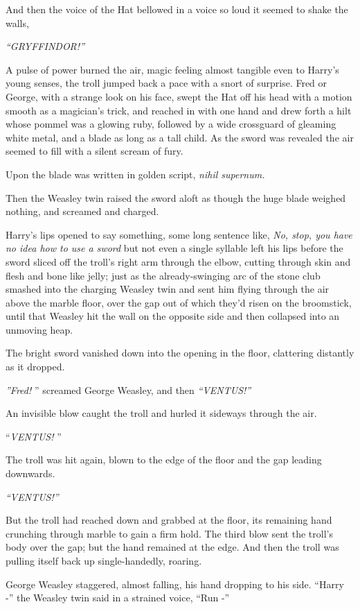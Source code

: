 And then the voice of the Hat bellowed in a voice so loud it seemed to
shake the walls,

\emph{``GRYFFINDOR!''}

A pulse of power burned the air, magic feeling almost tangible even to
Harry's young senses, the troll jumped back a pace with a snort of
surprise. Fred or George, with a strange look on his face, swept the Hat
off his head with a motion smooth as a magician's trick, and reached in
with one hand and drew forth a hilt whose pommel was a glowing ruby,
followed by a wide crossguard of gleaming white metal, and a blade as
long as a tall child. As the sword was revealed the air seemed to fill
with a silent scream of fury.

Upon the blade was written in golden script, \emph{nihil supernum.}

Then the Weasley twin raised the sword aloft as though the huge blade
weighed nothing, and screamed and charged.

Harry's lips opened to say something, some long sentence like, \emph{No,
stop, you have no idea how to use a sword} but not even a single
syllable left his lips before the sword sliced off the troll's right arm
through the elbow, cutting through skin and flesh and bone like jelly;
just as the already-swinging arc of the stone club smashed into the
charging Weasley twin and sent him flying through the air above the
marble floor, over the gap out of which they'd risen on the broomstick,
until that Weasley hit the wall on the opposite side and then collapsed
into an unmoving heap.

The bright sword vanished down into the opening in the floor, clattering
distantly as it dropped.

\emph{''Fred!} '' screamed George Weasley, and then \emph{``VENTUS!''}

An invisible blow caught the troll and hurled it sideways through the
air.

``\emph{VENTUS!} ''

The troll was hit again, blown to the edge of the floor and the gap
leading downwards.

\emph{``VENTUS!''}

But the troll had reached down and grabbed at the floor, its remaining
hand crunching through marble to gain a firm hold. The third blow sent
the troll's body over the gap; but the hand remained at the edge. And
then the troll was pulling itself back up single-handedly, roaring.

George Weasley staggered, almost falling, his hand dropping to his side.
``Harry -'' the Weasley twin said in a strained voice, ``Run -''

